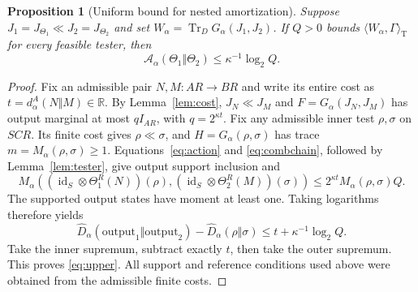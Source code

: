 \documentclass[11pt]{article}
\newcommand{\Tr}{\operatorname{Tr}}
\newcommand{\id}{\operatorname{id}}
\newcommand{\Dhat}{\widehat D}
\newcommand{\G}{G_\alpha}
\newcommand{\M}{M_\alpha}
\newcommand{\Adiv}{\mathcal A_\alpha}
\newcommand{\pair}[2]{\langle #1,#2\rangle_{\mathrm T}}
\newtheorem{proposition}[theorem]{Proposition}
\theoremstyle{remark}
\begin{document}
\begin{proposition}[Uniform bound for nested amortization]\label{prop:upper}
Suppose $J_1=J_{\Theta_1}\ll J_2=J_{\Theta_2}$ and set
$W_\alpha=\Tr_D\G(J_1,J_2)$. If $Q>0$ bounds
$\pair{W_\alpha}{\Gamma}$ for every feasible tester, then
\begin{equation}\label{eq:upper}
 \Adiv(\Theta_1\Vert\Theta_2)\leq\kappa^{-1}\log_2Q.
\end{equation}
\end{proposition}
\begin{proof}
Fix an admissible pair $N,M:AR\to BR$ and write its entire cost as
$t=d^A_\alpha(N\Vert M)\in\mathbb R$. By Lemma~\ref{lem:cost},
$J_N\ll J_M$ and $F=\G(J_N,J_M)$ has output marginal at most
$qI_{AR}$, with $q=2^{\kappa t}$. Fix any admissible inner test
$\rho,\sigma$ on $SCR$. Its finite cost gives $\rho\ll\sigma$, and
$H=\G(\rho,\sigma)$ has trace $m=\M(\rho,\sigma)\geq1$.
Equations~\eqref{eq:action} and \eqref{eq:combchain}, followed by
Lemma~\ref{lem:tester}, give output support inclusion and
\begin{equation}\label{eq:uniform}
 \M((\id_S\otimes\Theta_1^R(N))(\rho),
     (\id_S\otimes\Theta_2^R(M))(\sigma))
       \leq 2^{\kappa t}\M(\rho,\sigma)Q.
\end{equation}
The supported output states have moment at least one. Taking logarithms
therefore yields
\[
 \Dhat_\alpha(\mathrm{output}_1\Vert\mathrm{output}_2)
          -\Dhat_\alpha(\rho\Vert\sigma)
 \leq t+\kappa^{-1}\log_2Q.
\]
Take the inner supremum, subtract exactly $t$, then take the outer
supremum. This proves \eqref{eq:upper}. All support and reference conditions
used above were obtained from the admissible finite costs.
\end{proof}
\end{document}
